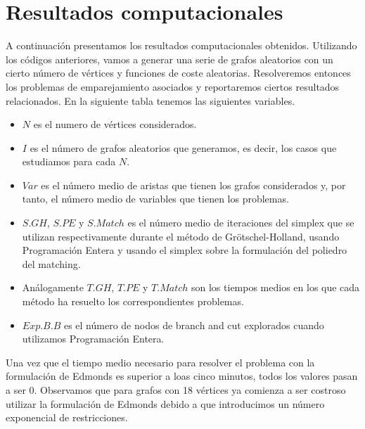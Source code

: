 \documentclass[twoside,a4paper,openright,12pt]{book}
\begin{document}
\section{Resultados computacionales}
A continuación presentamos los resultados computacionales obtenidos. Utilizando los códigos anteriores, vamos a generar una serie de grafos aleatorios con un cierto número de vértices y funciones de coste aleatorias. Resolveremos entonces los problemas de emparejamiento asociados y reportaremos ciertos resultados relacionados. En la siguiente tabla tenemos las siguientes variables.
\begin{itemize}
\item $N$ es el numero de vértices considerados.
\item $I$ es el número de grafos aleatorios que generamos, es decir, los casos que estudiamos para cada $N$.
\item $Var$ es el número medio de aristas que tienen los grafos considerados y, por tanto, el número medio de variables que tienen los problemas.
\item $S.GH$, $S.PE$ y $S.Match$ es el número medio de iteraciones del simplex que se utilizan respectivamente durante el método de Grötschel-Holland, usando Programación Entera y usando el simplex sobre la formulación del poliedro del matching.
\item Análogamente $T.GH$, $T.PE$ y $T.Match$ son los tiempos medios en los que cada método ha resuelto los correspondientes problemas.
\item $Exp.B.B$ es el número de nodos de branch and cut explorados cuando utilizamos Programación Entera.
\end{itemize} 
Una vez que el tiempo medio necesario para resolver el problema con la formulación de Edmonds es superior a loas cinco minutos, todos los valores pasan a ser $0$. Observamos que para grafos con 18 vértices ya comienza a ser costroso utilizar la formulación de Edmonds debido a que introducimos un número exponencial de restricciones.
\end{document}
